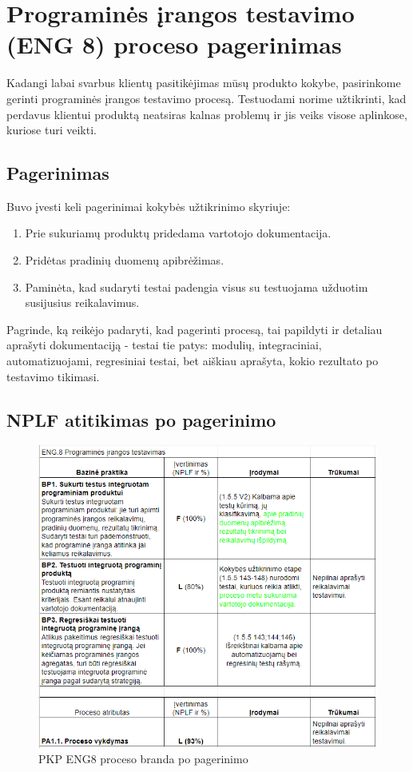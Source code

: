 \documentclass{VUMIFPSkursinis}
\begin{document}
\section{Programinės įrangos testavimo (ENG 8) proceso pagerinimas}	
	Kadangi labai svarbus klientų pasitikėjimas mūsų produkto kokybe, pasirinkome gerinti programinės įrangos testavimo procesą. Testuodami norime užtikrinti, kad perdavus klientui produktą neatsiras kalnas problemų ir jis veiks visose aplinkose, kuriose turi veikti.
	\subsection{Pagerinimas}
	Buvo įvesti keli pagerinimai kokybės užtikrinimo skyriuje:
	\begin{enumerate}
						\item Prie sukuriamų produktų pridedama vartotojo dokumentacija.
						\item Pridėtas pradinių duomenų apibrėžimas.
						\item Paminėta, kad sudaryti testai padengia visus su testuojama užduotim susijusius reikalavimus.
	\end{enumerate}
	Pagrinde, ką reikėjo padaryti, kad pagerinti procesą, tai papildyti ir detaliau aprašyti dokumentaciją - testai tie patys: modulių, integraciniai, automatizuojami, regresiniai testai, bet aiškiau aprašyta, kokio rezultato po testavimo tikimasi.
	\newpage
	
	\subsection{NPLF atitikimas po pagerinimo}
	\begin{figure}[htbp]
		\includegraphics[scale=0.9]{img/eng8_po_pakeitimo}
		\caption{PKP ENG8 proceso branda po pagerinimo} %
		\label{img:pkpPries}
	\end{figure}
	
\end{document}
